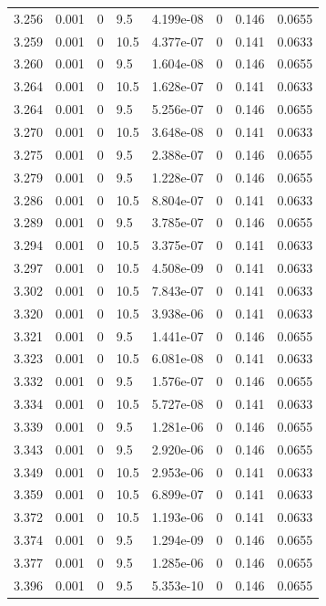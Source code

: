 \documentclass[preview]{standalone}
\begin{document}
{{{{{{{{{{\begin{tabular}{L{1.2cm}C{1.2cm} C{0.3cm}C{0.5cm} C{1.4cm}C{1.4cm} C{1.4cm}C{1.4cm}}
  3.256  &  0.001  & 0     & 9.5 &  4.199e-08  & 0  & 0.146 &  0.0655   \\ 
  3.259  &  0.001  & 0     & 10.5 &  4.377e-07  & 0  & 0.141 &  0.0633   \\ 
  3.260  &  0.001  & 0     & 9.5 &  1.604e-08  & 0  & 0.146 &  0.0655   \\ 
  3.264  &  0.001  & 0     & 10.5 &  1.628e-07  & 0  & 0.141 &  0.0633   \\ 
  3.264  &  0.001  & 0     & 9.5 &  5.256e-07  & 0  & 0.146 &  0.0655   \\ 
  3.270  &  0.001  & 0     & 10.5 &  3.648e-08  & 0  & 0.141 &  0.0633   \\ 
  3.275  &  0.001  & 0     & 9.5 &  2.388e-07  & 0  & 0.146 &  0.0655   \\ 
  3.279  &  0.001  & 0     & 9.5 &  1.228e-07  & 0  & 0.146 &  0.0655   \\ 
  3.286  &  0.001  & 0     & 10.5 &  8.804e-07  & 0  & 0.141 &  0.0633   \\ 
  3.289  &  0.001  & 0     & 9.5 &  3.785e-07  & 0  & 0.146 &  0.0655   \\ 
  3.294  &  0.001  & 0     & 10.5 &  3.375e-07  & 0  & 0.141 &  0.0633   \\ 
  3.297  &  0.001  & 0     & 10.5 &  4.508e-09  & 0  & 0.141 &  0.0633   \\ 
  3.302  &  0.001  & 0     & 10.5 &  7.843e-07  & 0  & 0.141 &  0.0633   \\ 
  3.320  &  0.001  & 0     & 10.5 &  3.938e-06  & 0  & 0.141 &  0.0633   \\ 
  3.321  &  0.001  & 0     & 9.5 &  1.441e-07  & 0  & 0.146 &  0.0655   \\ 
  3.323  &  0.001  & 0     & 10.5 &  6.081e-08  & 0  & 0.141 &  0.0633   \\ 
  3.332  &  0.001  & 0     & 9.5 &  1.576e-07  & 0  & 0.146 &  0.0655   \\ 
  3.334  &  0.001  & 0     & 10.5 &  5.727e-08  & 0  & 0.141 &  0.0633   \\ 
  3.339  &  0.001  & 0     & 9.5 &  1.281e-06  & 0  & 0.146 &  0.0655   \\ 
  3.343  &  0.001  & 0     & 9.5 &  2.920e-06  & 0  & 0.146 &  0.0655   \\ 
  3.349  &  0.001  & 0     & 10.5 &  2.953e-06  & 0  & 0.141 &  0.0633   \\ 
  3.359  &  0.001  & 0     & 10.5 &  6.899e-07  & 0  & 0.141 &  0.0633   \\ 
  3.372  &  0.001  & 0     & 10.5 &  1.193e-06  & 0  & 0.141 &  0.0633   \\ 
  3.374  &  0.001  & 0     & 9.5 &  1.294e-09  & 0  & 0.146 &  0.0655   \\ 
  3.377  &  0.001  & 0     & 9.5 &  1.285e-06  & 0  & 0.146 &  0.0655   \\ 
  3.396  &  0.001  & 0     & 9.5 &  5.353e-10  & 0  & 0.146 &  0.0655   \\ 
\hline 
\end{tabular} 

}}}}}}}}}}
\end{document}
